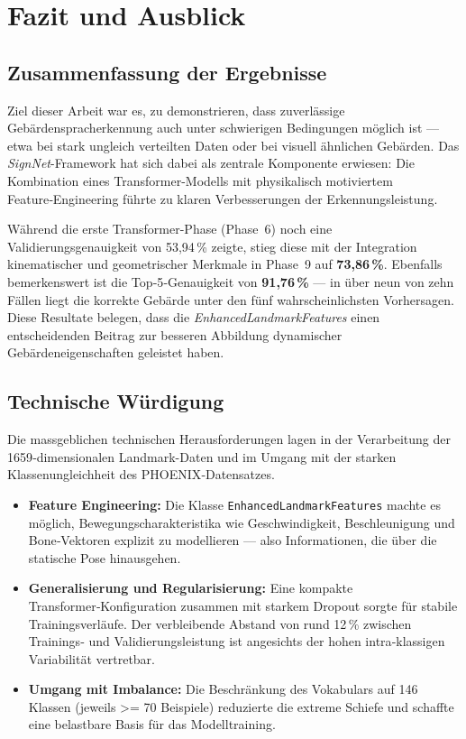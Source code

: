 \chapter{Fazit und Ausblick}
\label{ch:conclusion}

\section{Zusammenfassung der Ergebnisse}
Ziel dieser Arbeit war es, zu demonstrieren, dass zuverlässige Gebärdenspracherkennung auch unter schwierigen Bedingungen möglich ist — etwa bei stark ungleich verteilten Daten oder bei visuell ähnlichen Gebärden. Das \textit{SignNet}-Framework hat sich dabei als zentrale Komponente erwiesen: Die Kombination eines Transformer-Modells mit physikalisch motiviertem Feature‑Engineering führte zu klaren Verbesserungen der Erkennungsleistung.

Während die erste Transformer-Phase (Phase~6) noch eine Validierungsgenauigkeit von 53{,}94\,\% zeigte, stieg diese mit der Integration kinematischer und geometrischer Merkmale in Phase~9 auf \textbf{73{,}86\,\%}. Ebenfalls bemerkenswert ist die Top‑5‑Genauigkeit von \textbf{91{,}76\,\%} — in über neun von zehn Fällen liegt die korrekte Gebärde unter den fünf wahrscheinlichsten Vorhersagen. Diese Resultate belegen, dass die \textit{EnhancedLandmarkFeatures} einen entscheidenden Beitrag zur besseren Abbildung dynamischer Gebärdeneigenschaften geleistet haben.

\section{Technische Würdigung}
Die massgeblichen technischen Herausforderungen lagen in der Verarbeitung der 1659‑dimensionalen Landmark-Daten und im Umgang mit der starken Klassenungleichheit des PHOENIX‑Datensatzes.
\begin{itemize}
    \item \textbf{Feature Engineering:} Die Klasse \texttt{EnhancedLandmarkFeatures} machte es möglich, Bewegungscharakteristika wie Geschwindigkeit, Beschleunigung und Bone‑Vektoren explizit zu modellieren — also Informationen, die über die statische Pose hinausgehen.
    \item \textbf{Generalisierung und Regularisierung:} Eine kompakte Transformer‑Konfiguration zusammen mit starkem Dropout sorgte für stabile Trainingsverläufe. Der verbleibende Abstand von rund 12\,\% zwischen Trainings‑ und Validierungsleistung ist angesichts der hohen intra‑klassigen Variabilität vertretbar.
    \item \textbf{Umgang mit Imbalance:} Die Beschränkung des Vokabulars auf 146 Klassen (jeweils >= 70 Beispiele) reduzierte die extreme Schiefe und schaffte eine belastbare Basis für das Modelltraining.
\end{itemize}

